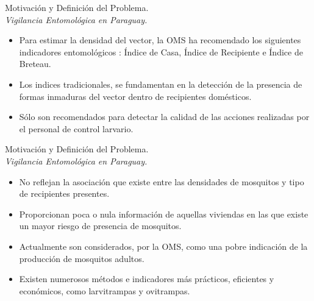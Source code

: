 
\begin{frame}[t]{Motivación y Definición del Problema.\\\textit{Vigilancia Entomológica en Paraguay.}}

    \begin{itemize}
      \item Para estimar la densidad del vector, la OMS ha recomendado los siguientes indicadores entomológicos : Índice de Casa, Índice de Recipiente e Índice de Breteau.

      \item  Los indices tradicionales, se fundamentan en la detección de la presencia de formas inmaduras del vector dentro de recipientes domésticos.

      \item Sólo son recomendados para detectar la calidad de las acciones realizadas por el personal de control larvario.


    \end{itemize}
\end{frame}


\begin{frame}[t]{Motivación y Definición del Problema.\\\textit{Vigilancia Entomológica en Paraguay.}}
    \begin{itemize}

      \item No reflejan la asociación que existe entre las densidades de mosquitos y tipo de recipientes presentes.

      \item Proporcionan poca o nula información de aquellas viviendas en las que existe un mayor riesgo de presencia de mosquitos.

      \item Actualmente son considerados, por la OMS, como una pobre indicación de la producción de mosquitos adultos.

      \item Existen numerosos métodos e indicadores más prácticos, eficientes y económicos, como larvitrampas y ovitrampas.

    \end{itemize}
\end{frame}


